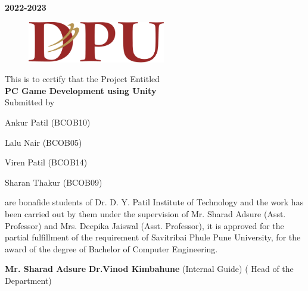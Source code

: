 \documentclass[12pt]{report}
\begin{document}
\large \textbf  {2022-2023}\\
\vspace{0.5 cm}

\clearpage


\begin{figure}[h]
\centering
\includegraphics[width=6cm]{Logo.png}
\end{figure}

\vspace{0.3 cm}

\vspace{0.4 cm}

\normalsize{This is to certify that the Project Entitled}\\
\vspace{0.3cm}
\large\textbf{PC Game Development using Unity}\\
\vspace{0.3 cm}
\normalsize{Submitted by}\\
\vspace{0.3 cm}

\normalsize  {Ankur Patil (BCOB10)}

\normalsize  {Lalu Nair (BCOB05)}

\normalsize  {Viren Patil (BCOB14)}

\normalsize  {Sharan Thakur (BCOB09)}

\vspace{0.2 cm}
\justifying
\setlength{\parindent}{4em}
\setlength{\parskip}{1em}
\renewcommand{\baselinestretch}{1.5}
\normalsize
are bonafide students of Dr. D. Y. Patil Institute of Technology and the work has been carried 
out by them under the supervision of Mr. Sharad Adsure (Asst. Professor) and Mrs. 
Deepika Jaiswal (Asst. Professor), it is approved for the partial fulfillment of the 
requirement of Savitribai Phule Pune University, for the award of the degree of Bachelor of Computer
Engineering.

\vspace{0.4 cm}
\setlength{\parindent}{0 em}
 \textbf{Mr. Sharad Adsure}  \hspace{6.9cm}          \textbf{ Dr.Vinod Kimbahune  }   \hspace{5.5cm}         
\centering
(Internal Guide)    \hspace{6.9 cm}  ( Head of the Department)  \hspace{1 cm}    \\
\end{document}
